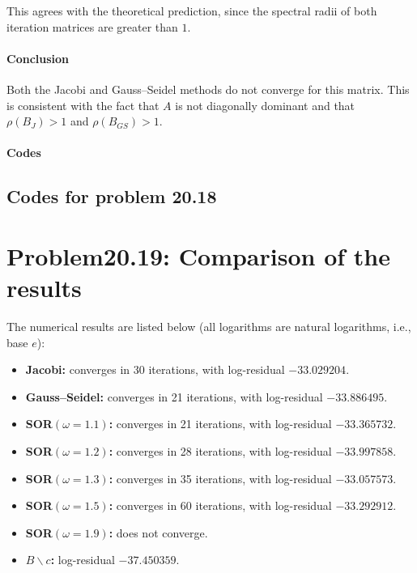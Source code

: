 \documentclass{ctexart}
\begin{document}
This agrees with the theoretical prediction, since the spectral radii of both iteration matrices are greater than $1$.

\paragraph{Conclusion}

Both the Jacobi and Gauss--Seidel methods do not converge for this matrix. This is consistent with the fact that $A$ is not diagonally dominant and that $\rho(B_J)>1$ and $\rho(B_{GS})>1$.
\paragraph{Codes}
\subsection{Codes for problem 20.18}

{\noindent}
\newpage
\section{Problem20.19: Comparison of the results}
The numerical results are listed below (all logarithms are natural logarithms, i.e., base $e$):
\begin{itemize}
  \item \textbf{Jacobi:} converges in 30 iterations, with log-residual $-33.029204$.
  \item \textbf{Gauss--Seidel:} converges in 21 iterations, with log-residual $-33.886495$.
  \item \textbf{SOR$(\omega=1.1)$:} converges in 21 iterations, with log-residual $-33.365732$.
  \item \textbf{SOR$(\omega=1.2)$:} converges in 28 iterations, with log-residual $-33.997858$.
  \item \textbf{SOR$(\omega=1.3)$:} converges in 35 iterations, with log-residual $-33.057573$.
  \item \textbf{SOR$(\omega=1.5)$:} converges in 60 iterations, with log-residual $-33.292912$.
  \item \textbf{SOR$(\omega=1.9)$:} does not converge.
  \item \textbf{$B\backslash c$:} log-residual $-37.450359$.
\end{itemize}
\end{document}
